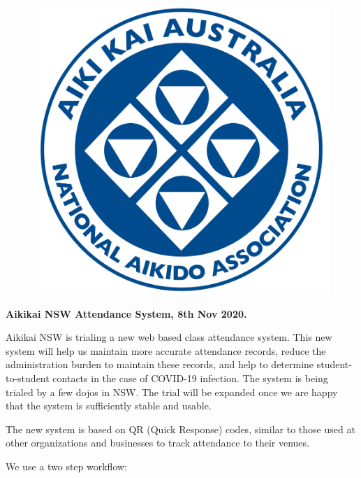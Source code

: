 
\begin{minipage}[t]{\dimexpr0.5\linewidth-1em}

\begin{figure}[H]
\centering\includegraphics[width=0.4\linewidth]{figure/logo-aka.jpg}
\end{figure}

\textbf{Aikikai NSW Attendance System, 8th Nov 2020.}

Aikikai NSW is trialing a new web based class attendance system.
This new system will help us maintain more accurate attendance records,
reduce the administration burden to maintain these records,
and help to determine student-to-student contacts in the case of COVID-19 infection.
The system is being trialed by a few dojos in NSW. The trial will
be expanded once we are happy that the system is sufficiently stable and usable.

\smallskip
The new system is based on QR (Quick Response) codes, similar to those used
at other organizations and businesses to track attendance to their venues.

\medskip
We use a two step workflow:


\end{minipage}

